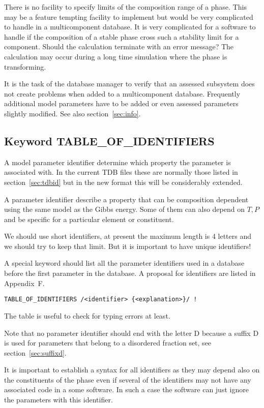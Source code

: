 \documentclass[12pt]{article}
\begin{document}
There is no facility to specify limits of the composition range of a
phase.  This may be a feature tempting facility to implement but would
be very complicated to handle in a multicomponent database.  It is
very complicated for a software to handle if the composition of a
stable phase cross such a stability limit for a component.  Should the
calculation terminate with an error message?  The calculation may 
occur during a long time simulation where the phase is transforming.

It is the task of the database manager to verify that an assessed
subsystem does not create problems when added to a multicomponent
database.  Frequently additional model parameters have to be added or
even assessed parameters slightly modified.  See also
section~\ref{sec:info}.

\subsection{Keyword TABLE\_OF\_IDENTIFIERS}\label{sec:paramid}

A model parameter identifier determine which property the parameter is
associated with.  In the current TDB files these are normally those
listed in section~\ref{sec:tdbid} but in the new format this will be
considerably extended.

A parameter identifier describe a property that can be composition
dependent using the same model as the Gibbs energy.  Some of them can
also depend on $T, P$ and be specific for a particular element or
constituent.  

We should use short identifiers, at present the maximum length is 4
letters and we should try to keep that limit.  But it is important to
have unique identifiers!

A special keyword should list all the parameter identifiers used in a
database before the first parameter in the database.  A proposal for
identifiers are listed in Appendix~F.
\begin{verbatim}
TABLE_OF_IDENTIFIERS /<identifier> {<explanation>}/ !
\end{verbatim}

The table is useful to check for typing errors at least.  

Note that no parameter identifier should end with the letter D because
a suffix D is used for parameters that belong to a disordered fraction
set, see section~\ref{sec:suffixd}.

It is important to establish a syntax for all identifiers as they may
depend also on the constituents of the phase even if several of the
identifiers may not have any associated code in a some software.  In
such a case the software can just ignore the parameters with this
identifier.
\end{document}
